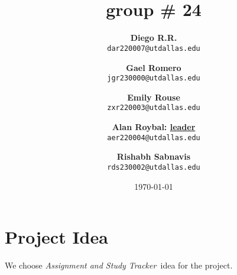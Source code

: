 \documentclass[12pt]{article}
\title{\groupname
\\ \small{group} \# 24}
\date{\today}
\author{
    \textbf{Diego R.R.} \\
    \texttt{dar220007@utdallas.edu} \\
    \and 
    \textbf{Gael Romero} \\
    \texttt{jgr230000@utdallas.edu} \\
    \and
    \textbf{Emily Rouse} \\
    \texttt{zxr220003@utdallas.edu} \\
    \and
    \textbf{Alan Roybal: \underline{leader}} \\
    \texttt{aer220004@utdallas.edu} \\
    \and
    \textbf{Rishabh Sabnavis} \\
    \texttt{rds230002@utdallas.edu}
}
\newcommand\projectname{\textit{Assignment and Study Tracker\ }}
\begin{document}
\maketitle

\section{Project Idea}
We choose \projectname idea for the project.
\end{document}
